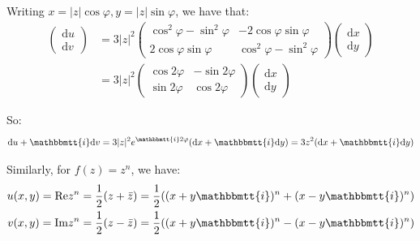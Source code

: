 \documentclass[]{ctexart}
\newcommand{\mi}{\mathbbmtt{i}}
\newcommand{\di}{\mathrm{d}}
\begin{document}
		Writing $x=|z|\cos \varphi, y=|z|\sin \varphi$, we have that:
			\begin{equation*}
			\begin{aligned}
				\begin{pmatrix}
					\di u\\
					\di v
				\end{pmatrix}
				&=3|z|^2
				\begin{pmatrix}
					\cos^2\varphi-\sin^2 \varphi & -2\cos\varphi \sin\varphi\\
					2\cos\varphi \sin\varphi & \cos^2\varphi-\sin^2 \varphi
				\end{pmatrix}
				\begin{pmatrix}
				\di x\\
				\di y
				\end{pmatrix}\\
				&=3|z|^2
				\begin{pmatrix}
				\cos2\varphi & -\sin2\varphi\\
				\sin2\varphi & \cos2\varphi
				\end{pmatrix}
				\begin{pmatrix}
				\di x\\
				\di y
				\end{pmatrix}
			\end{aligned}
			\end{equation*}
		
		So:
			\begin{equation*}
			\begin{aligned}
				\di u+\mi \di v=3|z|^2e^{\mi 2\varphi}(\di x+\mi \di y)=3z^2(\di x+\mi \di y)
			\end{aligned}
			\end{equation*}
			
		Similarly, for $f(z)=z^n$, we have:
			\begin{equation*}
			\begin{aligned}
				u(x,y)=\text{Re}z^n=\frac{1}{2}(z+\bar{z})=\frac{1}{2}((x+y\mi)^n+(x-y\mi)^n)\\
				v(x,y)=\text{Im}z^n=\frac{1}{2}(z-\bar{z})=\frac{1}{2}((x+y\mi)^n-(x-y\mi)^n)\\
			\end{aligned}
			\end{equation*}
			
\end{document}
